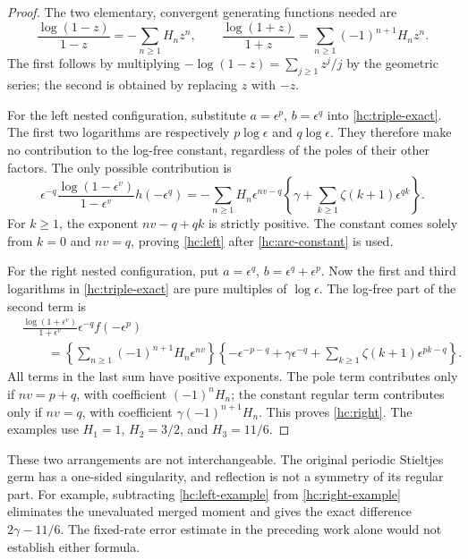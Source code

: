 \documentclass[11pt,a4paper]{article}
\numberwithin{equation}{section}
\theoremstyle{definition}
\theoremstyle{remark}
\begin{document}
\begin{proof}
The two elementary, convergent generating functions needed are
\begin{equation}\label{hc:harmonic-generators}
 \frac{\log(1-z)}{1-z}=-\sum_{n\ge1}H_nz^n,
 \qquad
 \frac{\log(1+z)}{1+z}=\sum_{n\ge1}(-1)^{n+1}H_nz^n.
\end{equation}
The first follows by multiplying
$-\log(1-z)=\sum_{j\ge1}z^j/j$ by the geometric series; the second
is obtained by replacing $z$ with $-z$.

For the left nested configuration, substitute
$a=\epsilon^p$, $b=\epsilon^q$ into \eqref{hc:triple-exact}.
The first two logarithms are respectively $p\log\epsilon$ and
$q\log\epsilon$. They therefore make no contribution to the
log-free constant, regardless of the poles of their other factors.
The only possible contribution is
\[
 \epsilon^{-q}\frac{\log(1-\epsilon^v)}{1-\epsilon^v}
                       h(-\epsilon^q)
 =-\sum_{n\ge1}H_n\epsilon^{nv-q}
       \left\{\gamma+\sum_{k\ge1}\zeta(k+1)\epsilon^{qk}\right\}.
\]
For $k\ge1$, the exponent $nv-q+qk$ is strictly positive. The constant
comes solely from $k=0$ and $nv=q$, proving \eqref{hc:left} after
\eqref{hc:arc-constant} is used.

For the right nested configuration, put
$a=\epsilon^q$, $b=\epsilon^q+\epsilon^p$. Now the first and third
logarithms in \eqref{hc:triple-exact} are pure multiples of
$\log\epsilon$. The log-free part of the second term is
\begin{align*}
 &\frac{\log(1+\epsilon^v)}{1+\epsilon^v}
          \epsilon^{-q}f(-\epsilon^p)\\
 &\qquad=\left\{\sum_{n\ge1}(-1)^{n+1}H_n\epsilon^{nv}\right\}
       \left\{-\epsilon^{-p-q}+\gamma\epsilon^{-q}
                +\sum_{k\ge1}\zeta(k+1)\epsilon^{pk-q}\right\}.
\end{align*}
All terms in the last sum have positive exponents. The pole term
contributes only if $nv=p+q$, with coefficient $(-1)^nH_n$; the
constant regular term contributes only if $nv=q$, with coefficient
$\gamma(-1)^{n+1}H_n$. This proves \eqref{hc:right}. The examples use
$H_1=1$, $H_2=3/2$, and $H_3=11/6$.
\end{proof}

These two arrangements are not interchangeable. The original periodic
Stieltjes germ has a one-sided singularity, and reflection is not a
symmetry of its regular part. For example, subtracting
\eqref{hc:left-example} from \eqref{hc:right-example} eliminates the
unevaluated merged moment and gives the exact difference
$2\gamma-11/6$. The fixed-rate error estimate in the preceding work
alone would not establish either formula.
\end{document}

